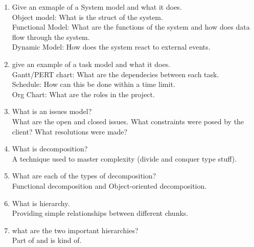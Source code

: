 \documentclass[10pt]{article}
\begin{document}
\begin{enumerate}
      \item Give an exmaple of a System model and what it does.\\
            Object model: What is the struct of the system.\\
            Functional Model: What are the functions of the system and how does data flow through the system.\\
            Dynamic Model: How does the system react to external events.\\

      \item give an example of a task model and what it does.\\
            Gantt/PERT chart: What are the dependecies between each task.\\
            Schedule: How can this be done within a time limit.\\
            Org Chart: What are the roles in the project.\\

      \item What is an issues model?\\
            What are the open and closed issues. What constraints were posed by the client? What resolutions were made?\\

      \item What is decomposition?\\
            A technique used to master complexity (divide and conquer type stuff).\\

      \item What are each of the types of decomposition?\\
            Functional decomposition and Object-oriented decomposition.\\

      \item What is hierarchy.\\
            Providing simple relationships between different chunks.\\

      \item what are the two important hierarchies?\\
            Part of and is kind of.\\
\end{enumerate}
\end{document}
